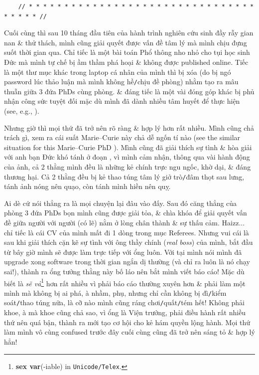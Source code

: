 \documentclass[12pt]{article}
\begin{document}
\begin{verbatim}
	// * * * * * * * * * * * * * * * * * * * * * * * * * * * * * * * * * * * * * //
\end{verbatim}

\noindent
{} Cuối cùng thì sau 10 tháng đầu tiên của hành trình nghiên cứu sinh đầy rẫy gian nan \& thử thách, mình cũng giải quyết được vấn đề tâm lý mà mình chịu đựng suốt thời gian qua. Chỉ tiếc là một bài toán Phổ thông nho nhỏ cho tụi học sinh Đức mà mình tự chế bị ầm thầm phá hoại \& không được published online. Tiếc là một thư mục khác trong laptop cá nhân của mình thì bị xóa (do bị ngó password lúc thảo luận mà mình không hề{\tt/}chịu đề phòng) nhằm tạo ra mâu thuẫn giữa 3 đứa PhDs cùng phòng. \& đáng tiếc là một vài đóng góp khác bị phủ nhận công sức tuyệt đối mặc dù mình đã dành nhiều tâm huyết để thực hiện (see, e.g., \cite{phill2018,Young-Powell2018}).

Nhưng giờ thì mọi thứ đã trở nên rõ ràng \& hợp lý hơn rất nhiều. Mình cũng chả trách gì, xem ra cái suất Marie--Curie này chả dễ ngốn tí nào (see the similar situation for this Marie--Curie PhD \cite{FundamentalPessimist2020}). Mình cũng đã giải thích sự tình \& hòa giải với anh bạn Đức khó tánh ở đoạn , vì mình cảm nhận, thông qua vài hành động của ảnh, cả 2 thằng mình đều là những kẻ chính trực ngu ngốc, khờ dại, \& đáng thương hại. Cả 2 thằng đều bị kẻ thao túng tâm lý giở trò{\tt/}đâm thọt sau lưng, tánh ảnh nóng nên quạo, còn tánh mình hiền nên quỵ.

Ai dè cứ nói thẳng ra là mọi chuyện lại đâu vào đấy. Sau đó căng thẳng của phòng 3 đứa PhDs bọn mình cũng được giải tỏa, \& chìa khóa để giải quyết vấn đề giữa người với người (có lẽ) nằm ở lòng chân thành \& sự thấu cảm. Haizz$\ldots$ chỉ tiếc là cái CV của mình mất đi 1 dòng trong mục Referees. Nhưng vui cái là sau khi giải thích cặn kẽ sự tình với ông thầy chính ({\it real boss}) của mình, bắt đầu từ bây giờ mình sẽ được làm trực tiếp với ổng luôn. Với tại mình nói mình đã upgrade xong software trong thời gian ngắn dị thường (và chỉ ra luôn là nó chạy sai!), thành ra ổng tưởng thằng này bố láo nên bắt mình viết báo cáo! Mặc dù biết là {\it sẽ vả}\footnote{\textbf{sex var}(-iable) in {\tt Unicode/Telex}.} hơn rất nhiều vì phải báo cáo thường xuyên hơn \& phải làm một mình mà không bị ai phá, à nhầm, phụ, nhưng chỉ cần không bị đì{\tt/}kiểm soát{\tt/}thao túng nữa, là cỡ nào mình cũng ráng chơi{\tt/}quất{\tt/}tém hết! Không phải khoe, à mà khoe cũng chả sao, vì ổng là Viện trưởng, phải điều hành rất nhiều thứ nên quá bận, thành ra mới tạo cơ hội cho kẻ hám quyền lộng hành. Mọi thứ làm mình vô cùng confused trước đây cuối cùng cũng đã trở nên sáng tỏ \& hợp lý hẳn!
\end{document}
